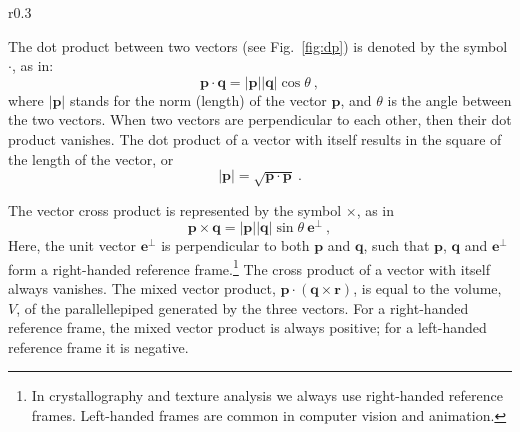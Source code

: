 \begin{wrapfigure}{r}{0.3\textwidth}
  \centering\leavevmode
{}
\caption{\small Illustration of the vector dot product as the projection of $\mathbf{p}$ onto $\mathbf{q}$, multiplied by the length $\vert\mathbf{q}\vert$.\label{fig:dp}}
\end{wrapfigure}

The dot product between two vectors (see Fig.~\ref{fig:dp}) is denoted by the symbol $\cdot$, as in:
\begin{equation}
	\mathbf{p}\cdot\mathbf{q} = \vert\mathbf{p}\vert\vert\mathbf{q}\vert\cos\theta \ ,\label{eq:dotproduct}
\end{equation}
where $\vert\mathbf{p}\vert$ stands for the norm (length) of the vector $\mathbf{p}$, and $\theta$ is the angle between the two vectors. When two vectors are perpendicular to each other, then their dot product vanishes.  The dot product of a vector with itself results in the square of the length of the vector, or
\begin{equation}
	\vert\mathbf{p}\vert = \sqrt{\mathbf{p}\cdot\mathbf{p}} \ .\label{eq:vectorlength}
\end{equation}

The vector cross product is represented by the symbol $\times$, as in
\begin{equation}
	\mathbf{p}\times\mathbf{q} = \vert\mathbf{p}\vert\vert\mathbf{q}\vert \sin\theta\ \mathbf{e}^{\perp} \ ,\label{eq:crossproduct}
\end{equation}
Here, the unit vector $\mathbf{e}^{\perp}$ is perpendicular to both $\mathbf{p}$ and $\mathbf{q}$, such that $\mathbf{p}$, $\mathbf{q}$ and $\mathbf{e}^{\perp}$ form a right-handed reference frame.\footnote{In crystallography and texture analysis we always use right-handed reference frames. Left-handed frames are common in computer vision and animation.}   The cross product of a vector with itself always vanishes. The mixed vector product, $\mathbf{p}\cdot(\mathbf{q}\times\mathbf{r})$, is equal to the volume, $V$, of the parallellepiped generated by the three vectors.  For a right-handed reference frame, the mixed vector product is always positive; for  a left-handed reference frame it is negative.

